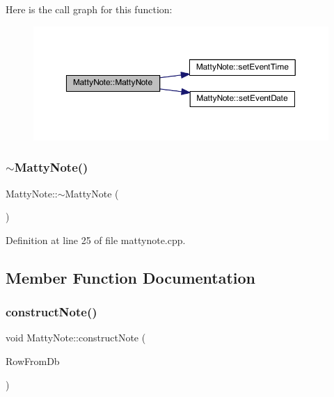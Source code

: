 Here is the call graph for this function\+:
\nopagebreak
\begin{figure}[H]
\begin{center}
\leavevmode
\includegraphics[width=350pt]{classMattyNote_a101e9c2475ee2567dfa2e168b543806f_cgraph}
\end{center}
\end{figure}
\hypertarget{classMattyNote_a2831641523b4a0d5c36100689f95c912}{}\label{classMattyNote_a2831641523b4a0d5c36100689f95c912} 
\subsubsection{\texorpdfstring{$\sim$\+Matty\+Note()}{~MattyNote()}}
{\footnotesize\ttfamily Matty\+Note\+::$\sim$\+Matty\+Note (\begin{DoxyParamCaption}{ }\end{DoxyParamCaption})}



Definition at line 25 of file mattynote.\+cpp.



\subsection{Member Function Documentation}
\hypertarget{classMattyNote_a180cda16bc8c77964169edb90468c151}{}\label{classMattyNote_a180cda16bc8c77964169edb90468c151} 
\subsubsection{\texorpdfstring{construct\+Note()}{constructNote()}}
{\footnotesize\ttfamily void Matty\+Note\+::construct\+Note (\begin{DoxyParamCaption}\item[{Q\+String\+List}]{Row\+From\+Db }\end{DoxyParamCaption})}



